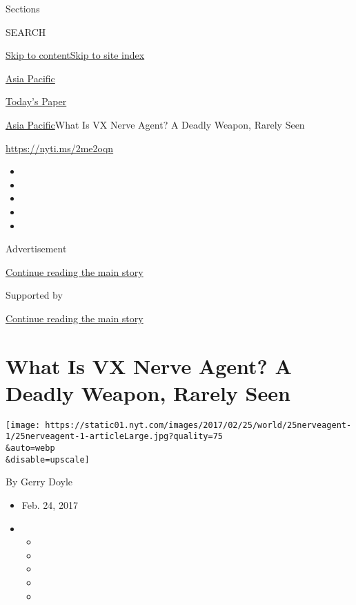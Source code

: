 Sections

SEARCH

\protect\hyperlink{site-content}{Skip to
content}\protect\hyperlink{site-index}{Skip to site index}

\href{https://www.nytimes.com/section/world/asia}{Asia Pacific}

\href{https://myaccount.nytimes.com/auth/login?response_type=cookie\&client_id=vi}{}

\href{https://www.nytimes.com/section/todayspaper}{Today's Paper}

\href{/section/world/asia}{Asia Pacific}\textbar{}What Is VX Nerve
Agent? A Deadly Weapon, Rarely Seen

\url{https://nyti.ms/2me2oqn}

\begin{itemize}
\item
\item
\item
\item
\item
\end{itemize}

Advertisement

\protect\hyperlink{after-top}{Continue reading the main story}

Supported by

\protect\hyperlink{after-sponsor}{Continue reading the main story}

\hypertarget{what-is-vx-nerve-agent-a-deadly-weapon-rarely-seen}{%
\section{What Is VX Nerve Agent? A Deadly Weapon, Rarely
Seen}\label{what-is-vx-nerve-agent-a-deadly-weapon-rarely-seen}}

\texttt{[image: https://static01.nyt.com/images/2017/02/25/world/25nerveagent-1/25nerveagent-1-articleLarge.jpg?quality=75\\\&auto=webp\\\&disable=upscale]}

By Gerry Doyle

\begin{itemize}
\item
  Feb. 24, 2017
\item
  \begin{itemize}
  \item
  \item
  \item
  \item
  \item
  \end{itemize}
\end{itemize}

